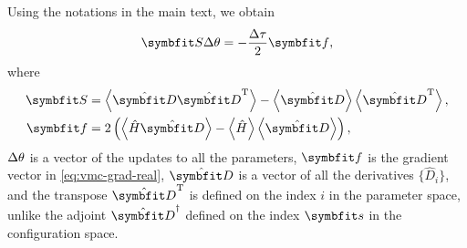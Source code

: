 Using the notations in the main text, we obtain
\begin{equation}
\mS \dth = -\frac{\dta}{2} \vf,
\end{equation}
where
\begin{align}
\mS &= \ev{\hat{\vD} \hat{\vD}^\transpose} - \ev{\hat{\vD}} \ev{\hat{\vD}^\transpose}, \\
\vf &= 2 \left( \ev{\hat{H} \hat{\vD}} - \ev{\hat{H}} \ev{\hat{\vD}} \right),
\end{align}
${\Delta \theta}$ is a vector of the updates to all the parameters, $\vf$ is the gradient vector in \cref{eq:vmc-grad-real}, $\hat{\vD}$ is a vector of all the derivatives $\{\hat{D}_i\}$, and the transpose $\hat{\vD}^\transpose$ is defined on the index $i$ in the parameter space, unlike the adjoint $\hat{\vD}^\dagger$ defined on the index $\vs$ in the configuration space.
